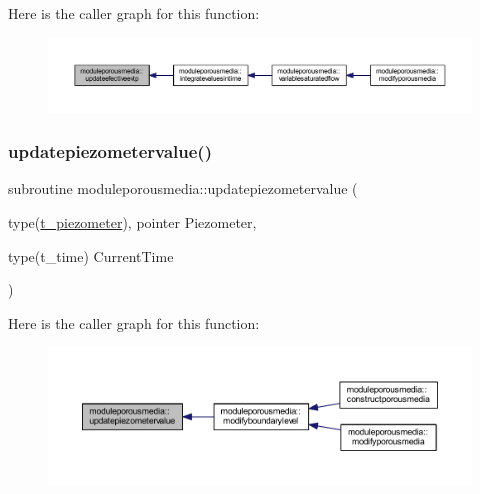 Here is the caller graph for this function\+:\nopagebreak
\begin{figure}[H]
\begin{center}
\leavevmode
\includegraphics[width=350pt]{namespacemoduleporousmedia_a06efe35a5a85d34f8db82ebe144c1def_icgraph}
\end{center}
\end{figure}
\mbox{\label{namespacemoduleporousmedia_a800f0d4d8cd48ad329f33e9bb42015a7}} 
\subsubsection{\texorpdfstring{updatepiezometervalue()}{updatepiezometervalue()}}
{\footnotesize\ttfamily subroutine moduleporousmedia\+::updatepiezometervalue (\begin{DoxyParamCaption}\item[{type(\mbox{\hyperlink{structmoduleporousmedia_1_1t__piezometer}{t\+\_\+piezometer}}), pointer}]{Piezometer,  }\item[{type(t\+\_\+time)}]{Current\+Time }\end{DoxyParamCaption})\hspace{0.3cm}{\ttfamily [private]}}

Here is the caller graph for this function\+:\nopagebreak
\begin{figure}[H]
\begin{center}
\leavevmode
\includegraphics[width=350pt]{namespacemoduleporousmedia_a800f0d4d8cd48ad329f33e9bb42015a7_icgraph}
\end{center}
\end{figure}
\mbox{\label{namespacemoduleporousmedia_a5232e9d01e4dffac7d88f9b9d10ddc3f}} 
